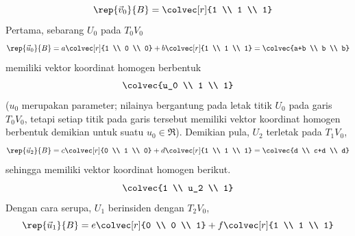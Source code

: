 \begin{exercises}
\begin{answer}
\begin{exparts}
\begin{equation*}
            \quad
            \rep{\vec{v}_0}{B}=\colvec[r]{1 \\ 1 \\ 1}
          \end{equation*}
        \partsitem
          Pertama, sebarang $U_0$ pada $T_0V_0$
          \begin{equation*}
            \rep{\vec{u}_0}{B}=a\colvec[r]{1 \\ 0 \\ 0}
                               +b\colvec[r]{1 \\ 1 \\ 1}
                              =\colvec{a+b \\ b \\ b}
          \end{equation*}
          memiliki vektor koordinat homogen berbentuk
          \begin{equation*}
            \colvec{u_0 \\ 1 \\ 1}      
          \end{equation*}
          ($u_0$ merupakan parameter; nilainya bergantung pada letak titik $U_0$
          pada garis $T_0V_0$, tetapi setiap titik pada garis tersebut memiliki
          vektor koordinat homogen berbentuk demikian untuk suatu $u_0\in\Re$).
          Demikian pula, $U_2$ terletak pada $T_1V_0$,
          \begin{equation*}
            \rep{\vec{u}_2}{B}=c\colvec[r]{0 \\ 1 \\ 0}
                                +d\colvec[r]{1 \\ 1 \\ 1}
                              =\colvec{d \\ c+d \\ d}
          \end{equation*}
          sehingga memiliki vektor koordinat homogen berikut.
          \begin{equation*}
            \colvec{1 \\ u_2 \\ 1}
          \end{equation*}
          Dengan cara serupa, $U_1$ berinsiden dengan $T_2V_0$,
          \begin{equation*}
            \rep{\vec{u}_1}{B}=e\colvec[r]{0 \\ 0 \\ 1}
                                +f\colvec[r]{1 \\ 1 \\ 1}

\end{equation*}
\end{exparts}
\end{answer}
\end{exercises}
